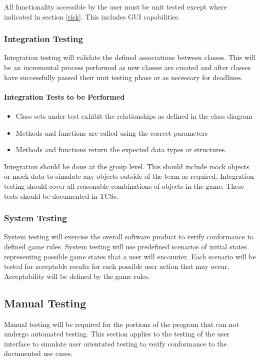 \documentclass[report]{article}
\newcounter{rc}
\begin{document}
All functionality accessible by the user must be unit tested except where indicated in section \ref{risk}. This includes GUI capabilities. 

\subsubsection{Integration Testing}
Integration testing will validate the defined associations between classes. This will be an incremental process performed as new classes are created and after classes have successfully passed their unit testing phase or as necessary for deadlines. 
\paragraph{Integration Tests to be Performed}
\begin{itemize}
\item Class sets under test exhibit the relationships as defined in the class diagram
\item Methods and functions are called using the correct parameters
\item Methods and functions return the expected data types or structures.
\end{itemize}

Integration should be done at the group level. This should include mock objects or mock data to simulate any objects outside of the team as required. Integration testing should cover all reasonable combinations of objects in the game. These tests should be documented in TCSs.

\subsubsection{System Testing}
System testing will exercise the overall software product to verify conformance to defined game rules. System testing will use predefined scenarios of initial states representing possible game states that a user will encounter. Each scenario will be tested for acceptable results for each possible user action that may occur. Acceptability will be defined by the game rules. 

\subsection{Manual Testing}
Manual testing will be required for the portions of the program that can not undergo automated testing. This section applies to the testing of the user interface to simulate user orientated testing to verify conformance to the documented use cases.
\end{document}
